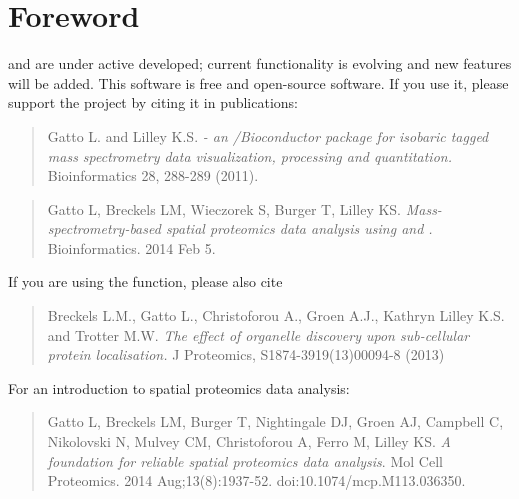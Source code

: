 \section*{Foreword}


 and  are under active developed;
current functionality is evolving and new features will be added.
This software is free and open-source software.  If you use it, please
support the project by citing it in publications:

\begin{quote}
  Gatto L. and Lilley K.S. \emph{ - an \R/Bioconductor
    package for isobaric tagged mass spectrometry data visualization,
    processing and quantitation.} Bioinformatics 28, 288-289 (2011).
\end{quote}

\begin{quote}
  Gatto L, Breckels LM, Wieczorek S, Burger T, Lilley KS.
  \textit{Mass-spectrometry-based spatial proteomics data analysis
    using  and .}
  Bioinformatics. 2014 Feb 5.
\end{quote}

If you are using the  function, please also cite

\begin{quote}
  Breckels L.M., Gatto L., Christoforou A., Groen A.J., Kathryn Lilley
  K.S. and Trotter M.W.  \emph{The effect of organelle discovery upon
    sub-cellular protein localisation.}  J Proteomics,
  S1874-3919(13)00094-8 (2013)
\end{quote}

For an introduction to spatial proteomics data analysis:

\begin{quote}
  Gatto L, Breckels LM, Burger T, Nightingale DJ, Groen AJ, Campbell
  C, Nikolovski N, Mulvey CM, Christoforou A, Ferro M, Lilley
  KS. \emph{A foundation for reliable spatial proteomics data
    analysis}. Mol Cell Proteomics. 2014
  Aug;13(8):1937-52. doi:10.1074/mcp.M113.036350.
\end{quote}